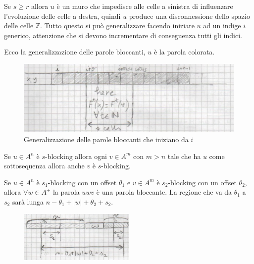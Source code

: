 Se $s\ge r$ allora $u$ è un muro che impedisce alle celle a sinistra di influenzare 
l'evoluzione delle celle a destra, quindi $u$ produce una disconnessione dello 
spazio delle celle $\mathbb{Z}$. Tutto questo si può generalizzare facendo iniziare 
$u$ ad un indige $i$ generico, attenzione che si devono incrementare di conseguenza 
tutti gli indici.

\begin{nota}
    Ecco la generalizzazione delle parole bloccanti, $u$ è la parola colorata.
    \begin{figure}[!h]
        \centering
        \includegraphics[width=.7\textwidth]{img/sistemi_complessi/parola_bloccante.png}
        \caption{Generalizzazione delle parole bloccanti che iniziano da $i$}
        \label{fig:parola_bloccante}
    \end{figure}
\end{nota}

\begin{nota}
    Se $u\in A^n$ è $s$-blocking allora ogni $v\in A^m$ con $m>n$ tale che ha 
    $u$ come sottosequenza allora anche $v$ è $s$-blocking.
\end{nota}

\begin{nota}
    Se $u\in A^n$ è $s_1$-blocking con un offset $\theta_1$ e $v\in A^m$ è  $s_2$-blocking
    con un offset $\theta_2$, allora $\forall w \in A^+$ la parola $uwv$ è una parola 
    bloccante. 
    La regione che va da $\theta_1$ a $s_2$ sarà lunga $n - \theta_1 + | w | + \theta_2 + s_2$.
    \begin{figure}[!h]
        \centering
        \includegraphics[width=0.5\textwidth]{img/sistemi_complessi/blocking_word_1.png}
    \end{figure}
\end{nota}

